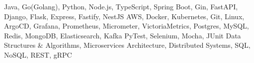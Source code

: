 




\addvspace{-1.5ex}
\begin{cvskills}
    {Java, Go(Golang), Python, Node.js, TypeScript, Spring Boot, Gin, FastAPI, Django, Flask, Express, Fastify, NestJS}
    {AWS, Docker, Kubernetes, Git, Linux, ArgoCD, Grafana, Prometheus, Micrometer, VictoriaMetrics, Postgres, MySQL, Redis, MongoDB, Elasticsearch, Kafka}
    {PyTest, Selenium, Mocha, JUnit}
    {Data Structures \& Algorithms, Microservices Architecture, Distributed Systems, SQL, NoSQL, REST, gRPC}
\end{cvskills}
\addvspace{1.5ex}